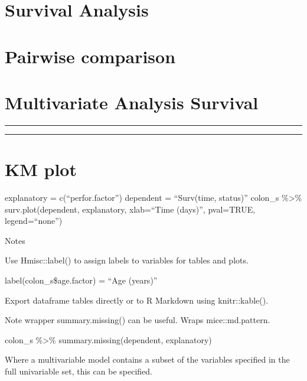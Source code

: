 \documentclass[]{article}
\begin{document}
\newpage
\begin{landscape}

\hypertarget{survival-analysis}{%
\section{Survival Analysis}\label{survival-analysis}}

\hypertarget{pairwise-comparison}{%
\section{Pairwise comparison}\label{pairwise-comparison}}

\hypertarget{multivariate-analysis-survival}{%
\section{Multivariate Analysis
Survival}\label{multivariate-analysis-survival}}

\begin{center}\rule{0.5\linewidth}{\linethickness}\end{center}

\begin{center}\rule{0.5\linewidth}{\linethickness}\end{center}

\hypertarget{km-plot}{%
\section{KM plot}\label{km-plot}}

explanatory = c(``perfor.factor'') dependent = ``Surv(time, status)''
colon\_s \%\textgreater\% surv.plot(dependent, explanatory, xlab=``Time
(days)'', pval=TRUE, legend=``none'')

Notes

Use Hmisc::label() to assign labels to variables for tables and plots.

label(colon\_s\$age.factor) = ``Age (years)''

Export dataframe tables directly or to R Markdown using knitr::kable().

Note wrapper summary.missing() can be useful. Wraps mice::md.pattern.

colon\_s \%\textgreater\% summary.missing(dependent, explanatory)

\end{landscape}

Where a multivariable model contains a subset of the variables specified
in the full univariable set, this can be specified.
\end{document}
